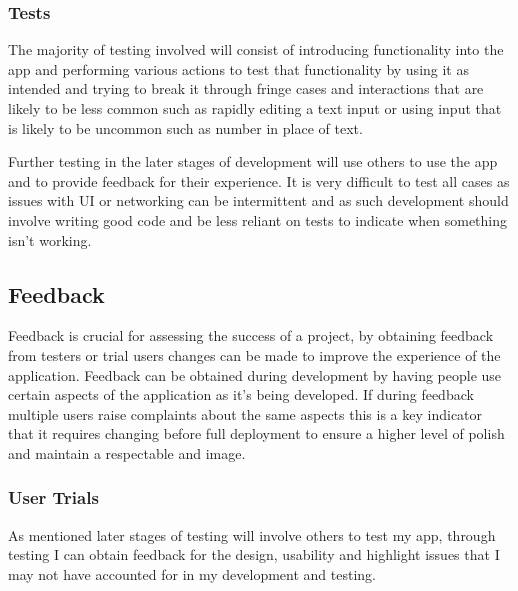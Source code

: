 \subsubsection{Tests}\label{tests}

The majority of testing involved will consist of introducing
functionality into the app and performing various actions to test that
functionality by using it as intended and trying to break it through
fringe cases and interactions that are likely to be less common such as
rapidly editing a text input or using input that is likely to be
uncommon such as number in place of text.

Further testing in the later stages of development will use others to
use the app and to provide feedback for their experience. It is very
difficult to test all cases as issues with UI or networking can be
intermittent and as such development should involve writing good code
and be less reliant on tests to indicate when something isn't working.

\subsection{Feedback}\label{feedback}

Feedback is crucial for assessing the success of a project, by obtaining
feedback from testers or trial users changes can be made to improve the
experience of the application. Feedback can be obtained during
development by having people use certain aspects of the application as
it's being developed. If during feedback multiple users raise complaints
about the same aspects this is a key indicator that it requires changing
before full deployment to ensure a higher level of polish and maintain a
respectable and image.

\subsubsection{User Trials}\label{user-trials}

As mentioned later stages of testing will involve others to test my app,
through testing I can obtain feedback for the design, usability and
highlight issues that I may not have accounted for in my development and
testing.
